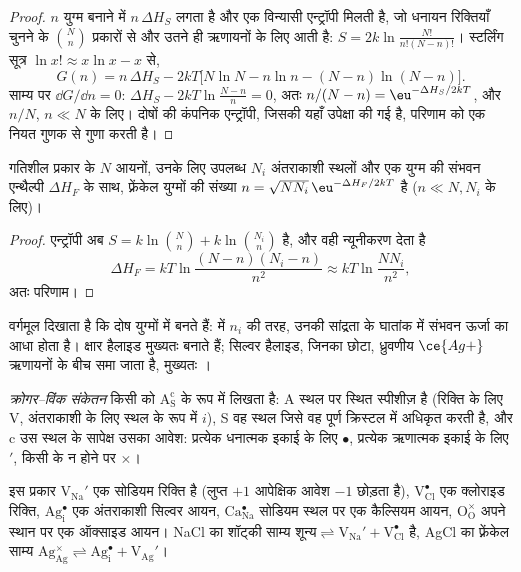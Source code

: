 \begin{proof}
$n$ युग्म बनाने में $n\,\Delta H_S$ लगता है और एक विन्यासी एन्ट्रॉपी मिलती है, जो धनायन रिक्तियाँ चुनने के
$\binom{N}{n}$ प्रकारों से और उतने ही ऋणायनों के लिए आती है:
$S = 2k\ln\frac{N!}{n!(N - n)!}$। स्टर्लिंग सूत्र $\ln x! \approx x\ln x - x$ से,
\[
  G(n) = n\,\Delta H_S - 2kT\bigl[N\ln N - n\ln n - (N - n)\ln(N - n)\bigr].
\]
साम्य पर $\dd G/\dd n = 0$: $\Delta H_S - 2kT\ln\frac{N - n}{n} = 0$, अतः $n/(N - n) = \eu^{-\Delta H_S/2kT}$, और $n/N$,
$n \ll N$ के लिए। दोषों की कंपनिक एन्ट्रॉपी, जिसकी यहाँ उपेक्षा की गई है,
परिणाम को एक नियत गुणक से गुणा करती है।
\end{proof}

\begin{proposition}[फ़्रेंकेल दोष]\label{prop:b3:solid-state:frenkel}
गतिशील प्रकार के $N$ आयनों, उनके लिए उपलब्ध $N_i$ अंतराकाशी स्थलों और
एक युग्म की संभवन एन्थैल्पी $\Delta H_F$ के साथ, फ़्रेंकेल युग्मों की संख्या $n =
\sqrt{NN_i}\,\eu^{-\Delta H_F/2kT}$ है ($n \ll N, N_i$ के लिए)।
\end{proposition}

\begin{proof}
एन्ट्रॉपी अब $S = k\ln\binom{N}{n} + k\ln\binom{N_i}{n}$ है, और वही न्यूनीकरण देता है
\[
  \Delta H_F = kT\ln\frac{(N - n)(N_i - n)}{n^2} \approx kT\ln\frac{NN_i}{n^2},
\]
अतः परिणाम।
\end{proof}

वर्गमूल दिखाता है कि दोष युग्मों में बनते हैं:  में $n_i$ की तरह,
उनकी सांद्रता के घातांक में संभवन ऊर्जा का आधा होता है। क्षार
हैलाइड मुख्यतः  बनाते हैं; सिल्वर हैलाइड, जिनका छोटा, ध्रुवणीय
$\ce{Ag+}$ ऋणायनों के बीच समा जाता है, मुख्यतः ।

\begin{definition}[क्रोगर--विंक संकेतन]\label{def:b3:solid-state:kroger-vink}
\emph{क्रोगर--विंक संकेतन} किसी  को
$\mathrm{A_S^c}$ के रूप में लिखता है: A स्थल पर स्थित स्पीशीज़ है (रिक्ति के लिए V, अंतराकाशी के लिए
स्थल के रूप में $i$), S वह स्थल जिसे वह पूर्ण क्रिस्टल में अधिकृत करती है, और c उस स्थल के सापेक्ष
उसका आवेश: प्रत्येक धनात्मक इकाई के लिए $\bullet$, प्रत्येक ऋणात्मक
इकाई के लिए $'$, किसी के न होने पर $\times$।
\end{definition}

इस प्रकार $\mathrm{V_{Na}'}$ एक सोडियम रिक्ति है (लुप्त $+1$ आपेक्षिक आवेश $-1$ छोड़ता है),
$\mathrm{V_{Cl}^{\bullet}}$ एक क्लोराइड रिक्ति, $\mathrm{Ag_i^{\bullet}}$ एक अंतराकाशी सिल्वर आयन, $\mathrm{Ca_{Na}^{\bullet}}$
सोडियम स्थल पर एक कैल्सियम आयन, $\mathrm{O_O^{\times}}$ अपने स्थान पर एक ऑक्साइड आयन। NaCl का शॉट्की साम्य
$\text{शून्य} \rightleftharpoons \mathrm{V_{Na}' + V_{Cl}^{\bullet}}$ है, AgCl का फ़्रेंकेल साम्य
$\mathrm{Ag_{Ag}^{\times}} \rightleftharpoons \mathrm{Ag_i^{\bullet} + V_{Ag}'}$।


